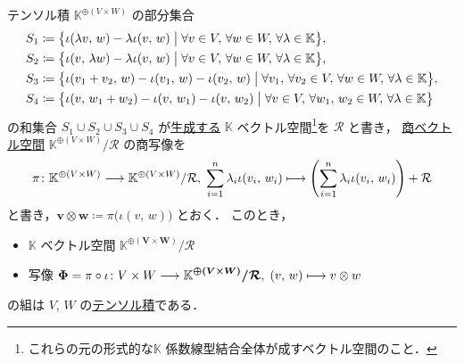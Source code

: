 \documentclass[geometry_main]{subfiles}
\begin{document}
\begin{myprop}[label=prop:tensor-vec, breakable]{テンソル積}
	$\mathbb{K}^{\oplus (V \times W)}$ の部分集合
	\begin{align}
		S_1 &\coloneqq \bigl\{\iota(\lambda v,\, w) - \lambda \iota(v,\, w) \bigm| \forall v \in V,\, \forall w \in W,\, \forall \lambda \in \mathbb{K} \bigr\} , \\
		S_2 &\coloneqq \bigl\{\iota(v,\, \lambda w) - \lambda \iota(v,\, w) \bigm| \forall v \in V,\, \forall w \in W,\, \forall \lambda \in \mathbb{K} \bigr\}, \\
		S_3 &\coloneqq \bigl\{\iota(v_1 + v_2,\, w) - \iota(v_1,\, w) - \iota(v_2,\, w) \bigm| \forall v_1,\, \forall v_2 \in V,\, \forall w \in W,\, \forall \lambda \in \mathbb{K} \bigr\}, \\
		S_4 &\coloneqq \bigl\{\iota(v,\, w_1 + w_2) - \iota(v,\, w_1) - \iota(v,\, w_2) \bigm| \forall v \in V,\, \forall w_1,\, w_2 \in W,\, \forall \lambda \in \mathbb{K} \bigr\}
	\end{align}
	の和集合 $S_1 \cup S_2 \cup S_3 \cup S_4$ が\hyperref[prop:gen-submodule]{生成する} $\mathbb{K}$ ベクトル空間\footnote{これらの元の形式的な$\mathbb{K}$ 係数線型結合全体が成すベクトル空間のこと．}を $\mathcal{R}$ と書き，
	\hyperref[prop:quotient-vec]{商ベクトル空間}
	$\mathbb{K}^{\oplus (V \times W)} / \mathcal{R}$ 
	の商写像を
	\begin{align}
		\pi \colon \mathbb{K}^{\oplus (V \times W)} \longrightarrow \mathbb{K}^{\oplus (V \times W)} / \mathcal{R},\; \sum_{i=1}^n \lambda_i \iota(v_i,\, w_i) \longmapsto \left( \sum_{i=1}^n \lambda_i \iota(v_i,\, w_i) \right) + \mathcal{R}
	\end{align}
	と書き，$\bm{v \otimes w} \coloneqq \pi \bigl( \iota (v,\, w) \bigr)$ とおく．
	このとき，
	\begin{itemize}
		\item $\mathbb{K}$ ベクトル空間 $\bm{\mathbb{K}^{\oplus (V \times W)} / \mathcal{R}}$
		\item 写像 $\bm{\Phi} = \pi \circ \iota \colon V \times W \longrightarrow \bm{\mathbb{K}^{\oplus (V \times W)} / \mathcal{R}},\; (v,\, w) \longmapsto v \otimes w$
	\end{itemize}
	の組は $V,\, W$ の\hyperref[def:univ-tensor-vec]{テンソル積}である．
\end{myprop}
\end{document}
